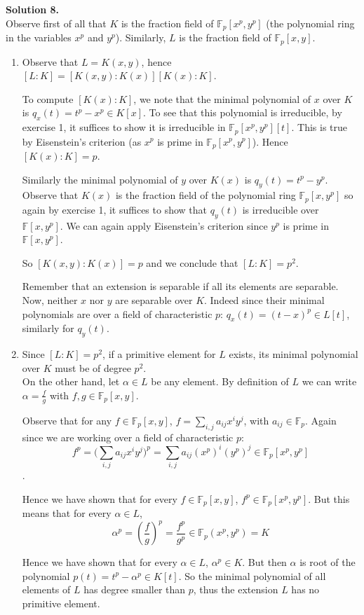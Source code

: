 \documentclass[12pt,a4paper]{article}
\begin{document}
\textbf{Solution 8.  }\\

Observe first of all that $K$ is the fraction field of $\mathbb{F}_p[x^p, y^p]$ (the polynomial ring in the variables $x^p$ and $y^p$). Similarly, $L$ is the fraction field of $\mathbb{F}_p[x, y]$. 

\begin{enumerate}
\item Observe that $L=K(x,y)$, hence $[L:K]=[K(x,y):K(x)] [K(x):K]$. 

To compute $[K(x):K]$, we note that the minimal polynomial of $x$ over $K$ is $q_x(t)=t^p-x^p\in K[x]$. To see that this polynomial  is irreducible, by exercise 1, it suffices to show it is irreducible in $\mathbb{F}_p[x^p, y^p][t]$. This is true by Eisenstein's criterion (as $x^p$ is prime in $\mathbb{F}_p[x^p, y^p]$). Hence $[K(x):K]=p$. 

Similarly the minimal polynomial of $y$ over $K(x)$ is $q_y(t)=t^p-y^p$. Observe that $K(x)$ is the fraction field of the polynomial ring $\mathbb{F}_p[x,y^p]$ so again by exercise 1, it suffices to show that $q_y(t)$ is irreducible over $\mathbb{F}[x,y^p]$. We can again apply Eisenstein's criterion since $y^p$ is prime in $\mathbb{F}[x,y^p]$. 

So $[K(x,y):K(x)]=p$ and we conclude that $[L:K]=p^2$. 

Remember that an extension is separable if all its elements are separable. Now, neither $x$ nor $y$ are separable over $K$. Indeed since their minimal polynomials are over a field of characteristic $p$: $q_x(t)=(t-x)^p\in L[t]$, similarly for $q_y(t)$.

\item Since $[L:K]=p^2$, if a primitive element for $L$ exists, its minimal polynomial over $K$ must be of degree $p^2$. \\
On the other hand, let $\alpha\in L$ be any element. By definition of $L$ we can write $\alpha=\tfrac{f}{g}$ with $f,g\in \mathbb{F}_p[x, y]$. 

Observe that for any $f\in \mathbb{F}_p[x, y]$,  $f=\sum_{i,j}a_{ij}x^{i}y^{j}$, with $a_{ij}\in \mathbb{F}_p$. Again since we are working over a field of characteristic $p$: 
$$ f^p= \Big(\sum_{i,j}a_{ij}x^{i}y^{j}\Big)^p=\sum_{i,j}a_{ij}(x^p)^{i}(y^p)^{j}\in \mathbb{F}_p[x^p, y^p]$$.

Hence we have shown that for every $f \in \mathbb{F}_p[x, y]$, $f^p\in \mathbb{F}_p[x^p, y^p]$. But this means that for every $\alpha \in L$, 
$$\alpha^p = (\frac{f}{g})^p =\frac{f^p}{g^p} \in \mathbb{F}_p(x^p, y^p)=K$$

Hence we have shown that for every $\alpha \in L$, $\alpha^p\in K$. But then $\alpha$ is root of the polynomial $p(t)=t^p-\alpha^p \in K[t]$. So the minimal polynomial of all elements of $L$ has degree smaller than $p$, thus the extension $L$ has no primitive element. 

\end{enumerate}
\end{document}

